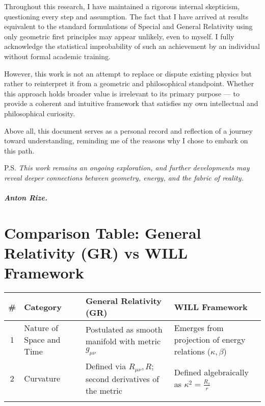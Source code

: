 \documentclass{article}
\begin{document}
\begin{theorem}
Throughout this research, I have maintained a rigorous internal skepticism, questioning every step and assumption. The fact that I have arrived at results equivalent to the standard formulations of Special and General Relativity using only geometric first principles may appear unlikely, even to myself. I fully acknowledge the statistical improbability of such an achievement by an individual without formal academic training.

However, this work is not an attempt to replace or dispute existing physics but rather to reinterpret it from a geometric and philosophical standpoint. Whether this approach holds broader value is irrelevant to its primary purpose — to provide a coherent and intuitive framework that satisfies my own intellectual and philosophical curiosity.

Above all, this document serves as a personal record and reflection of a journey toward understanding, reminding me of the reasons why I chose to embark on this path.


P.S. \textit{This work remains an ongoing exploration, and further developments may reveal deeper connections between geometry, energy, and the fabric of reality.
}

                                                                                                                                                               \subparagraph{\textit{Anton Rize.}}
                                                                                                                                                               
                                                                                                                                                               
\section*{Comparison Table: General Relativity (GR) vs WILL Framework}

\begin{tabularx}{\textwidth}{@{}clXX@{}}
\toprule
\# & Category & \textbf{General Relativity (GR)} & \textbf{WILL Framework} \\
\midrule
1 & Nature of Space and Time & 
Postulated as smooth manifold with metric \( g_{\mu\nu} \) & 
Emerges from projection of energy relations (\( \kappa, \beta \)) \\
\addlinespace

2 & Curvature & 
Defined via \( R_{\mu\nu}, R \); second derivatives of the metric & 
Defined algebraically as \( \kappa^2 = \frac{R_s}{r} \) \\
\addlinespace


\end{tabularx}
\end{theorem}
\end{document}

